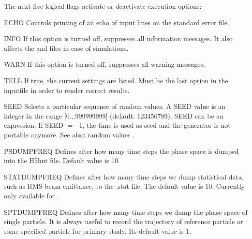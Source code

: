 The next five logical flags activate or deactivate execution options:
\begin{kdescription}
  \item[ECHO]
  Controls printing of an echo of input lines on the standard error file.

  \item[INFO]
  If this option is turned off, \opal suppresses all information messages. It also affects the  and   files in case of \opalcycl simulations.

  \item[WARN]
  If this option is turned off, \opal suppresses all warning messages.

  \item[TELL]
  If true, the current settings are listed. Must be the last option in the inputfile in order to render correct results.

  \item[SEED]
  Selects a particular sequence of random values.
  A SEED value is an integer in the range [0...999999999] (default: 123456789).
  SEED can be an expression. If SEED $=$ -1, the time is used as seed and the generator is not portable anymore.
  See also: random values .

  \item[PSDUMPFREQ]
  Defines after how many time steps the phase space is dumped into the H5hut file. Default value is 10.

  \item[STATDUMPFREQ]
  Defines after how many time steps we dump statistical data, such as RMS beam emittance, to the .stat file.
  The default value is 10. Currently only available for \opalt.

  \item[SPTDUMPFREQ]
  Defines after how many time steps we dump the phase space of single particle.
  It is always useful to record the trajectory of reference particle
  or some specified particle for primary study. Its default value is 1.


\end{kdescription}
